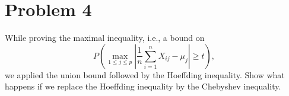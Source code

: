 \section*{Problem 4}
\begin{myanswerbox}
While proving the maximal inequality, i.e., a bound on
\[ P\left(\max_{1 \leq j \leq p} \left| \frac{1}{n} \sum_{i=1}^{n} X_{ij} - \mu_j \right| \geq t \right), \]
we applied the union bound followed by the Hoeffding inequality. Show what happens if we replace the Hoeffding inequality by the Chebyshev inequality.
\end{myanswerbox}
